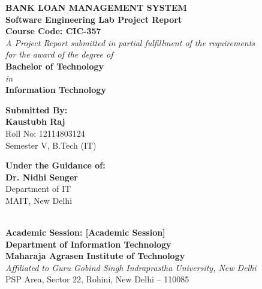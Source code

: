 \begin{titlepage}
\begin{center}
    \vspace*{0.5cm}
    {\Huge \textbf{\color{navyblue}BANK LOAN MANAGEMENT SYSTEM}}\\[0.8cm]
    {\Large \textbf{Software Engineering Lab Project Report}}\\[0.4cm]
    {\large \textbf{Course Code: CIC-357}}\\[1.5cm]

    \textit{A Project Report submitted in partial fulfillment of the requirements}\\
    \textit{for the award of the degree of}\\[0.4cm]
    {\large \textbf{Bachelor of Technology}}\\[0.2cm]
    \textit{in}\\[0.2cm]
    {\large \textbf{Information Technology}}\\[1.5cm]

    \begin{minipage}{0.45\textwidth}
        \begin{flushleft} \large
            \textbf{Submitted By:}\\
            \textbf{Kaustubh Raj}\\
            Roll No: 12114803124\\
            Semester V, B.Tech (IT)
        \end{flushleft}
    \end{minipage}
    \hfill
    \begin{minipage}{0.45\textwidth}
        \begin{flushright} \large
            \textbf{Under the Guidance of:}\\
            \textbf{Dr. Nidhi Senger}\\
            Department of IT\\
            MAIT, New Delhi
        \end{flushright}
    \end{minipage}\\[2.0cm]

    \textbf{Academic Session: [Academic Session]}\\[1.5cm]

    {\large \textbf{Department of Information Technology}}\\
    {\large \textbf{Maharaja Agrasen Institute of Technology}}\\
    \textit{Affiliated to Guru Gobind Singh Indraprastha University, New Delhi}\\
    PSP Area, Sector 22, Rohini, New Delhi -- 110085\\[0.5cm]
\end{center}
\end{titlepage}
